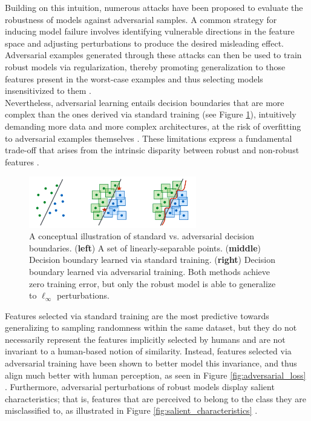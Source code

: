 Building on this intuition, numerous attacks have been proposed to evaluate the 
robustness of models against adversarial samples. A common strategy for inducing model 
failure involves identifying vulnerable directions in the feature space and adjusting 
perturbations to produce the desired misleading effect. Adversarial examples 
generated through these attacks can then be used to train robust models via 
regularization, thereby promoting generalization to those features present in the 
worst-case examples and thus selecting models insensitivized
to them
\cite{baiRecentAdvancesAdversarial2021}.\\

Nevertheless, adversarial learning entails decision boundaries 
that are more complex than the ones derived via standard training
(see Figure \ref{fig:adversarial_complexity}), 
intuitively demanding more data and more complex 
architectures, at the risk of
overfitting to adversarial examples themselves
\cite{schmidtAdversariallyRobustGeneralization2018}. 
These limitations express a fundamental trade-off 
that arises from the intrinsic 
disparity between robust and non-robust features
\cite{tsiprasRobustnessMayBe2019, zhangTheoreticallyPrincipledTradeoff2019}. \\

\begin{figure}
    \centering
    \includegraphics[width=0.65\textwidth]{img/introduction/adversarial_complexity.png}
    \caption{
    A conceptual illustration of standard vs. adversarial 
    decision boundaries. (\textbf{left}) A set of linearly-separable points. 
    (\textbf{middle}) Decision boundary learned via standard training.
    (\textbf{right}) Decision boundary learned via adversarial training.
    Both methods achieve zero training error, but only the robust model
    is able to generalize to $\ell_\infty$ perturbations.
    \cite{madryDeepLearningModels2019}
    }
    \label{fig:adversarial_complexity}
\end{figure}

Features selected via standard training
are the most predictive towards generalizing
to sampling randomness within the same dataset, but they do
not necessarily represent the features implicitly selected 
by humans and are not invariant to a human-based notion 
of similarity. Instead, features selected via adversarial training 
have been shown to better model this
invariance, and thus align much better with 
human perception, as seen in Figure \ref{fig:adversarial_loss}
\cite{ilyasAdversarialExamplesAre2019}. Furthermore, adversarial perturbations of robust 
models display salient characteristics;
that is, features that are perceived to belong to the
class they are misclassified to, as illustrated in Figure \ref{fig:salient_characteristics}
\cite{tsiprasRobustnessMayBe2019}. \\

